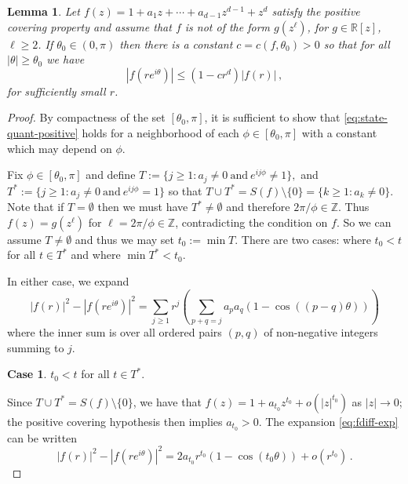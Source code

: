 \documentclass{daj}
\newcommand{\R}{\mathbb{R}}
\def\Z{\mathbb{Z}}
\def\t{\theta}
\def\eit{e^{i\theta}}
\newtheorem{lemma}[theorem]{Lemma}
\theoremstyle{definition}
\newtheorem{case}{Case}
\theoremstyle{remark}
\begin{document}
\begin{lemma}\label{lem:quant-positive}
	Let $f(z) = 1 + a_1 z + \cdots + a_{d-1}z^{d-1} + z^d$ satisfy the positive covering property and assume that $f$ is not of the form $g(z^{\ell})$, for $g \in \R[z]$, $\ell \geq 2$.
	If $\theta_0 \in (0,\pi)$ then there is a constant $c = c(f,\t_0) >0$  so that for all $|\theta| \geq \theta_0$  we have 
	\begin{equation} \label{eq:state-quant-positive}  |f(r\eit)| \leq (1 - cr^d)|f(r)|  \, , \end{equation}
	for sufficiently small $r$.
\end{lemma} 


\begin{proof}
By compactness of the set $[\theta_0,\pi]$, it is sufficient to show that \eqref{eq:state-quant-positive} holds for a neighborhood of each $\phi \in [\theta_0,\pi]$ with a constant which may depend on $\phi$. %

Fix $\phi \in [\theta_0,\pi]$ and define $T := \{ j \geq 1 : a_j \neq 0\ \mathrm{ and }\ e^{ij\phi} \neq 1 \}, $ and $T^{\ast} := \{ j \geq 1 : a_j \neq 0\ \mathrm{ and }\ e^{ij\phi} = 1 \}$ so that $T\cup T^{\ast} = S(f) \setminus \{0\} = \{ k \geq 1 : a_k \not= 0\}$. Note that if $T = \emptyset$ then we must have 
$T^{\ast} \not= \emptyset$ and therefore $2\pi/\phi \in \Z$. Thus $f(z) = g(z^{\ell})$ for $\ell = 2\pi/\phi \in \Z$, contradicting the condition on $f$.  So we can assume $T \not= \emptyset$ and thus we may set $t_0 := \min T$. There are two cases: where $t_0 < t$ for all $t \in T^\ast$ and where $\min T^\ast < t_0$.

In either case, we expand  
\begin{equation} \label{eq:fdiff-exp} 
|f(r)|^2 - |f(r \eit)|^2= \sum_{j\geq 1} r^j \left( \sum_{p+q=j} a_pa_q ( 1 - \cos((p-q)\t)) \right)
\end{equation}
where the inner sum is over all ordered pairs $(p,q)$ of non-negative integers summing to $j$. 


\begin{case}\label{case:first}
	$t_0 < t$ for all $t \in T^\ast$.
\end{case}
%
Since $T \cup T^\ast = S(f) \setminus \{0\}$, we have that $f(z) = 1 + a_{t_0} z^{t_0} + o(|z|^{t_0})$ as $|z| \to 0$; the positive covering hypothesis then implies $a_{t_0} > 0$.  The expansion \eqref{eq:fdiff-exp} can be written  
$$
|f(r)|^2 - |f(r \eit)|^2= 2 a_{t_0} r^{t_0} (1 - \cos(t_{0} \theta)) + o(r^{t_0})\,.
$$
 

\end{proof}
\end{document}
